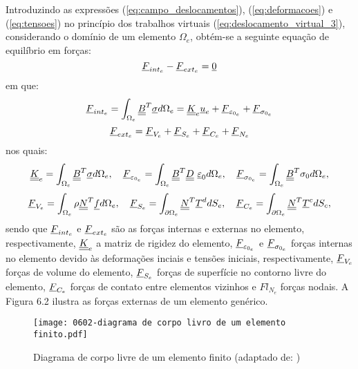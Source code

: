 Introduzindo as expressões (\ref{eq:campo_deslocamentos}), (\ref{eq:deformacoes}) e (\ref{eq:tensoes}) no princípio dos trabalhos virtuais (\ref{eq:deslocamento_virtual_3}), considerando o domínio de um elemento $\Omega_e$, obtém-se a seguinte equação de equilíbrio em forças:
\begin{equation}
	\label{eq:forcas_interna_externa}
	\underline{F}_{int_e} - \underline{F}_{ext_e} = \underline 0
\end{equation}
em que:
\begin{equation}
	\label{eq:forca_interna}
	\underline{F}_{int_e} = \int_{\Omega_e} \underline{\underline B}^T \underline \sigma d\Omega_e = \underline{\underline K}_e \underline u_e + \underline{F}_{\varepsilon_{0_e}} + \underline{F}_{\sigma_{0_e}}
\end{equation}
\begin{equation}
	\label{eq:forca_externa}
	\underline{F}_{ext_e} = \underline{F}_{V_e} + \underline{F}_{S_e} + \underline{F}_{C_e} + \underline{F}_{N_e}
\end{equation}
nos quais:
\begin{equation}
	\label{eq:elementos_forca_interna}
	\underline{\underline K}_e = \int_{\Omega_e} \underline{\underline B}^T \underline \sigma d\Omega_e,~~~ \underline{F}_{\varepsilon_{0_e}} = \int_{\Omega_e} \underline{\underline B}^T \underline{\underline D}~ \underline{\varepsilon}_0 d\Omega_e,~~~ \underline{F}_{\sigma_{0_e}} = \int_{\Omega_e} \underline{\underline B}^T \sigma_0 d\Omega_e,
\end{equation}
\begin{equation}
	\label{eq:elementos_forca_externa}
	\underline{F}_{V_e} = \int_{\Omega_e} \rho \underline{\underline N}^T \underline f d\Omega_e,~~~ \underline{F}_{S_e} = \int_{\partial \Omega_e} \underline{\underline N}^T \underline T^d dS_e,~~~
	\underline{F}_{C_e} = \int_{\partial \Omega_{e}} \underline{\underline N}^T \underline T^c dS_c,
\end{equation}
sendo que $\underline{F}_{int_e}$ e $\underline{F}_{ext_e}$ são as forças internas e externas no elemento, respectivamente, $\underline{\underline K}_e$ a matriz de rigidez do elemento, $\underline{F}_{\varepsilon_{0_e}}$ e $\underline{F}_{\sigma_{0_e}}$  forças internas no elemento devido às deformações inciais e tensões iniciais, respectivamente, $\underline{F}_{V_e}$ forças de volume do elemento, $\underline{F}_{S_e}$ forças de superfície no contorno livre do elemento, $\underline{F}_{C_e}$ forças de contato entre elementos vizinhos e $Fl_{N_e}$  forças nodais. A Figura 6.2 ilustra as forças externas de um elemento genérico.
\begin{figure}[H]
	\begin{center}
		\texttt{[image: 0602-diagrama de corpo livro de um elemento finito.pdf]}
	\end{center}
	\caption{\label{discretizacao_MEF}Diagrama de corpo livre de um elemento finito (adaptado de: )}
\end{figure}
